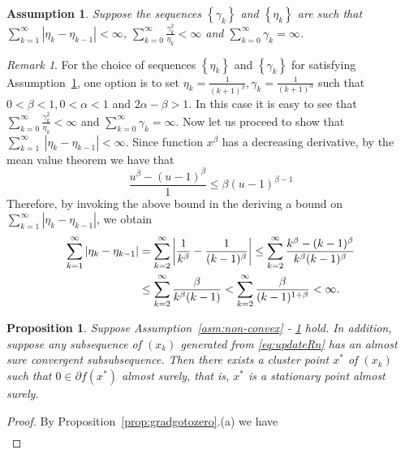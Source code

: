 \documentclass[11pt,reqno]{amsart}
\newcommand{\1}{{\bf 1}}
\newcommand{\2}{{\bf 2}}
\newcommand{\al}{\alpha}
\numberwithin{equation}{section}
\newtheorem{proposition}{Proposition}[section]
\newtheorem{assumption}{Assumption}[section]
\theoremstyle{remark}
\newtheorem{remark}{Remark}[section]
\begin{document}
{				\begin{assumption}\label{asm:etagammanoncvx}
					Suppose the sequences $\left\{ \gamma_k \right\}$ and $\left\{ \eta_k\right\}$ are such that  $\sum_{k=1}^\infty|\eta_k-\eta_{k-1}| < \infty$, $\sum_{k=0}^\infty\frac{\gamma_k^2}{\eta_k} < \infty$ and $\sum_{k=0}^\infty\gamma_k = \infty$. 
				\end{assumption}
				\begin{remark}\label{Rk: etagammanoncvx}
					For the choice of sequences $\left\{\eta_k\right\}$ and $\left\{\gamma_k\right\}$ for satisfying Assumption~\ref{asm:etagammanoncvx}, one option is to set $\eta_k=\tfrac{1}{(k+1)^\beta}, \gamma_k=\tfrac{1}{(k+1)^\al}$ such that $0 <\beta<1 , 0<\al < 1$ and $2\al-\beta>1$. In this case it is easy to see that $ \sum_{k=0}^\infty\tfrac{\gamma_k^2}{\eta_k} < \infty$ and $\sum_{k=0}^\infty\gamma_k = \infty$. Now let us proceed to show that $\sum_{k=1}^\infty \ |\eta_k-\eta_{k-1}| < \infty$. Since function $x^\beta$ has a decreasing derivative, by the mean value theorem we have that 
					\begin{equation*}
						\frac{u^\beta-(u-1)^\beta}{1} \leq \beta(u-1)^{\beta-1}
					\end{equation*}
					Therefore, by invoking the above bound in the deriving a bound on $\sum_{k=1}^\infty|\eta_k-\eta_{k-1}|$, we obtain
					\begin{align}\label{eq:etak-etak-1}
						\sum_{k=1}^\infty|\eta_k-\eta_{k-1}| & = \sum_{k=2}^{\infty}\left|\frac{1}{k^\beta}-\frac{1}{(k-1)^\beta}\right| \leq \sum_{k=2}^\infty \notag \frac{k^\beta-(k-1)^\beta}{k^\beta (k-1)^{\beta}} \\
						& \leq \sum_{k=2}^\infty\frac{\beta}{k^\beta (k-1)} < \sum_{k=2}^\infty\frac{\beta}{(k-1)^{1+\beta}} < \infty.
					\end{align}
				\end{remark}	
				\begin{proposition}
					Suppose Assumption~\ref{asm:non-convex} - \ref{asm:etagammanoncvx} hold. In addition, suppose any subsequence of $(x_k)$ generated from \eqref{eq:updateRn} has an almost sure convergent subsubsequence. Then there exists a cluster point $x^{\ast}$ of $(x_k)$ such that $0 \in \partial f(x^*)$ almost surely, that is, $x^*$ is a stationary point almost surely.
				\end{proposition}
				\begin{proof}
				By Proposition~\ref{prop:gradgotozero}.(a) we have 
				\begin{align}\label{eq:Enablafeta}

\end{align}
\end{proof}}
\end{document}
